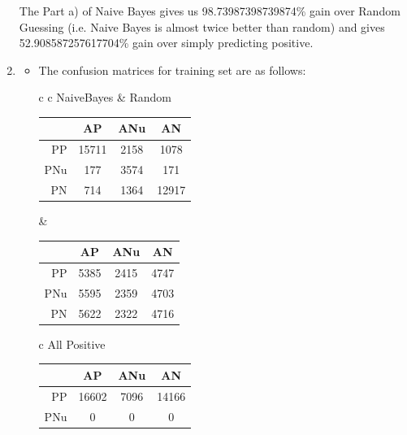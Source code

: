 \documentclass[12pt]{article}
\begin{document}
\begin{enumerate}[label=(\alph*)]
    The Part a) of Naive Bayes gives us 98.73987398739874\% gain over Random Guessing (i.e. Naive Bayes is almost twice better than random) and gives 52.908587257617704\% gain over simply predicting positive.

    \item \begin{itemize}
        \item The confusion matrices for training set are as follows:
        \begin{center}
            \begin{tabular}{c c}
                NaiveBayes & Random \\
                \begin{tabular}{r|c|c|c}
                    & AP & ANu & AN \\
                    \hline
                    PP & 15711 & 2158 & 1078\\
                    \hline
                    PNu & 177 & 3574 & 171 \\
                    \hline
                    PN & 714 & 1364 & 12917 \\
                    \hline
                \end{tabular} & 
                \begin{tabular}{r|c|c|c}
                    & AP & ANu & AN \\
                    \hline
                    PP & 5385 & 2415 & 4747\\
                    \hline
                    PNu & 5595 & 2359 & 4703 \\
                    \hline
                    PN & 5622 & 2322 & 4716 \\
                    \hline
                \end{tabular}
            \end{tabular}
            \end{center}
            \begin{center}
            \begin{tabular}{c}
                All Positive \\
                \begin{tabular}{r|c|c|c}
                    & AP & ANu & AN \\
                    \hline
                    PP & 16602 & 7096 & 14166\\
                    \hline
                    PNu & 0 & 0 & 0 \\

\end{tabular}
\end{tabular}
\end{center}
\end{itemize}
\end{enumerate}
\end{document}
